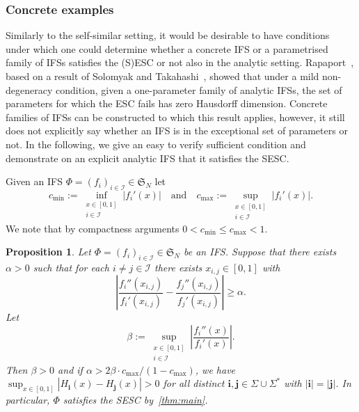 \documentclass[12pt,]{article}
\def\cref#1{\ref{#1}}%
\newtheorem{proposition}[theorem]{Proposition}
\theoremstyle{definition}
\theoremstyle{remark}
\newcommand{\0}{\mathbf{0}}
\newcommand{\bi}{\mathbf{i}}
\newcommand{\bj}{\mathbf{j}}
\begin{document}
\subsubsection{Concrete examples}\label{sec:examples}
Similarly to the self-similar setting, it would be desirable to have conditions under which one
could determine whether a concrete IFS or a parametrised family of IFSs satisfies the (S)ESC or not
also in the analytic setting. Rapaport~\cite[Corollary 1.4]{Rapaport_SelfConfESC25arXiv}, based on a
result of Solomyak and Takahashi~\cite{SolomyakTakahashi_IMRN21}, showed that under a mild
non-degeneracy condition, given a one-parameter family of analytic IFSs, the set of parameters for
which the ESC fails has zero Hausdorff dimension. Concrete families of IFSs can be constructed to
which this result applies, however, it still does not explicitly say whether an IFS is in the
exceptional set of parameters or not. 
In the following, we give an easy to verify sufficient condition and demonstrate on
an explicit analytic IFS that it satisfies the SESC. 

Given an IFS $\Phi=(f_i)_{i\in\mathcal{I}}\in\mathfrak{S}_N$ let
\begin{equation}\label{eq:maxmincontract}
  c_{\min} := \inf_{\substack{x\in[0,1] \\ i\in\mathcal{I}}} |f_i'(x)| \quad\text{and}\quad
  c_{\max}:=\sup_{\substack{x\in[0,1] \\ i\in\mathcal{I}}} |f_i'(x)|.
\end{equation}
We note that by compactness arguments $0<c_{\min} \leq c_{\max} <1$.

\begin{proposition}\label{prop:example}
Let $\Phi=(f_i)_{i\in\mathcal{I}}\in\mathfrak{S}_N$ be an IFS. Suppose that there exists $\alpha>0$
such that for each $i\neq j\in\mathcal{I}$ there exists $x_{i,j}\in[0,1]$ with
\begin{equation*}
\left| \frac{f_i''(x_{i,j})}{f_i'(x_{i,j})} - \frac{f_j''(x_{i,j})}{f_j'(x_{i,j})} \right| \geq \alpha . 
\end{equation*}
Let
\begin{equation*}
  \beta:=\sup_{\substack{x\in[0,1] \\ i\in\mathcal{I}}} \left| \frac{f_i''(x)}{f_i'(x)} \right|.
\end{equation*}
Then $\beta>0$ and if $\alpha > 2\beta\cdot c_{\max}/(1-c_{\max})$, we have
$
\sup_{x\in[0,1]} |H_{\bi}(x) - H_{\bj}(x)| > 0 
$
for all distinct $\bi,\bj \in\Sigma\cup\Sigma^*$ with $|\bi|=|\bj|$. In particular, $\Phi$ satisfies
the SESC by~\cref{thm:main}.
\end{proposition}
\end{document}
